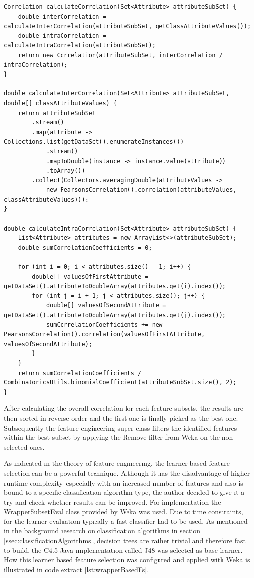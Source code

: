 \begin{lstlisting}[caption={AttributeSelectionStrategy}, label={lst:attributeSelectionStrategy}]
Correlation calculateCorrelation(Set<Attribute> attributeSubSet) {
	double interCorrelation = calculateInterCorrelation(attributeSubSet, getClassAttributeValues());
	double intraCorrelation = calculateIntraCorrelation(attributeSubSet);
	return new Correlation(attributeSubSet, interCorrelation / intraCorrelation);
}

double calculateInterCorrelation(Set<Attribute> attributeSubSet, double[] classAttributeValues) {
	return attributeSubSet
		.stream()
		.map(attribute -> Collections.list(getDataSet().enumerateInstances())
			.stream()
			.mapToDouble(instance -> instance.value(attribute))
			.toArray())
		.collect(Collectors.averagingDouble(attributeValues ->
			new PearsonsCorrelation().correlation(attributeValues, classAttributeValues)));
}

double calculateIntraCorrelation(Set<Attribute> attributeSubSet) {
	List<Attribute> attributes = new ArrayList<>(attributeSubSet);
	double sumCorrelationCoefficients = 0;
	
	for (int i = 0; i < attributes.size() - 1; i++) {
		double[] valuesOfFirstAttribute = getDataSet().attributeToDoubleArray(attributes.get(i).index());
		for (int j = i + 1; j < attributes.size(); j++) {
			double[] valuesOfSecondAttribute = getDataSet().attributeToDoubleArray(attributes.get(j).index());
			sumCorrelationCoefficients += new PearsonsCorrelation().correlation(valuesOfFirstAttribute, valuesOfSecondAttribute);
		}
	}
	return sumCorrelationCoefficients / CombinatoricsUtils.binomialCoefficient(attributeSubSet.size(), 2);
}
\end{lstlisting}

After calculating the overall correlation for each feature subsets, the results are then sorted in reverse order and the first one is finally picked as the best one. Subsequently the feature engineering super class filters the identified features within the best subset by applying the Remove filter from Weka on the non-selected ones. 

As indicated in the theory of feature engineering, the learner based feature selection can be a powerful technique. Although it has the disadvantage of higher runtime complexity, especially with an increased number of features and also is bound to a specific classification algorithm type, the author decided to give it a try and check whether results can be improved. For implementation the WrapperSubsetEval class provided by Weka was used. Due to time constraints, for the learner evaluation typically a fast classifier had to be used. As mentioned in the background research on classification algorithms in section \ref{ssec:classificationAlgorithms}, decision trees are rather trivial and therefore fast to build, the C4.5 Java implementation called J48 was selected as base learner. How this learner based feature selection was configured and applied with Weka is illustrated in code extract \ref{lst:wrapperBasedFs}. 

